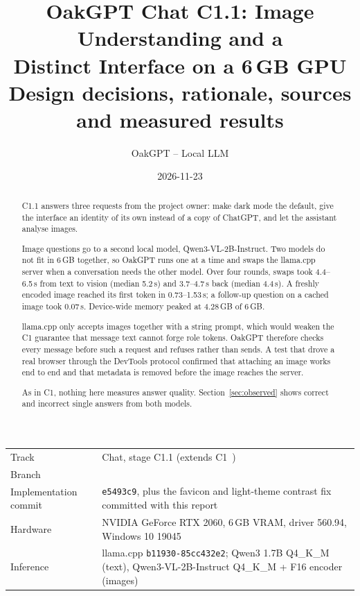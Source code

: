 \documentclass[11pt,a4paper]{article}
\title{\textbf{OakGPT Chat C1.1: Image Understanding and a\\Distinct Interface on a 6\,GB GPU}\\[4pt]
  \large Design decisions, rationale, sources and measured results}
\author{OakGPT -- Local LLM}
\date{2026-11-23}
\newcommand{\code}[1]{\texttt{#1}}
\begin{document}
\maketitle

\begin{center}
\small
\begin{tabularx}{0.92\textwidth}{@{}lY@{}}
\toprule
Track & Chat, stage C1.1 (extends C1~\cite{c1}) \\
Branch &  \\
Implementation commit & \code{e5493c9}, plus the favicon and light-theme contrast fix
  committed with this report \\
Hardware & NVIDIA GeForce RTX 2060, 6\,GB VRAM, driver 560.94, Windows 10 19045 \\
Inference & llama.cpp \code{b11930-85cc432e2}; Qwen3 1.7B Q4\_K\_M (text),
  Qwen3-VL-2B-Instruct Q4\_K\_M + F16 encoder (images) \\
\bottomrule
\end{tabularx}
\end{center}

\begin{abstract}
\noindent C1.1 answers three requests from the project owner: make dark mode the default,
give the interface an identity of its own instead of a copy of ChatGPT, and let the
assistant analyse images.

Image questions go to a second local model, Qwen3-VL-2B-Instruct. Two models do not fit
in 6\,GB together, so OakGPT runs one at a time and swaps the llama.cpp server when a
conversation needs the other model. Over four rounds, swaps took 4.4--6.5\,s from text
to vision (median 5.2\,s) and 3.7--4.7\,s back (median 4.4\,s). A freshly encoded image
reached its first token in 0.73--1.53\,s; a follow-up question on a cached image took
0.07\,s. Device-wide memory peaked at 4.28\,GB of 6\,GB.

llama.cpp only accepts images together with a string prompt, which would weaken the C1
guarantee that message text cannot forge role tokens. OakGPT therefore checks every
message before such a request and refuses rather than sends. A test that drove a real
browser through the DevTools protocol confirmed that attaching an image works end to
end and that metadata is removed before the image reaches the server.

As in C1, nothing here measures answer quality. Section~\ref{sec:observed} shows correct
and incorrect single answers from both models.
\end{abstract}
\end{document}
